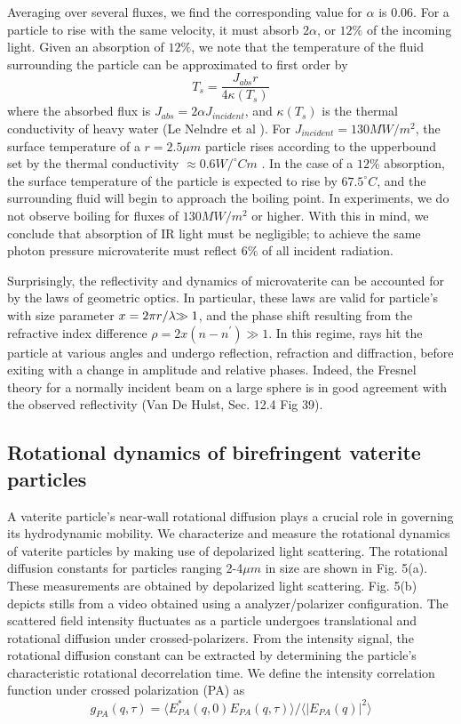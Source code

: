 {Averaging over several fluxes, we find the corresponding value for $\alpha$ is 0.06. For a particle to rise with the same velocity, it must  absorb  $2\alpha$, or $12\%$ of the incoming light.  Given an absorption of $12\%$, we note that the temperature of the fluid surrounding
the particle can be approximated to first order by 
\[
T_{s}=\frac{J_{abs}r}{4\kappa(T_{s})}
\]
 where the absorbed flux is $J_{abs}=2\alpha J_{incident}$, and $\kappa(T_{s})$
is the thermal conductivity of heavy water (Le Nelndre et al ). For
$J_{incident}=130 MW/m^{2}$, the surface temperature of a $r=2.5\mu m$
particle rises according to the upperbound set by the thermal conductivity $\approx 0.6\text{}W/^{\circ}Cm$ . In the case of a $12\%$ absorption,
the surface temperature of the particle is expected to rise by $67.5^{\circ}C$,
and the surrounding fluid will begin to approach the boiling point.
In experiments, we do not observe boiling for fluxes of $130MW/m^{2}$
or higher. With this in mind, we conclude that absorption
of IR light must be negligible; to achieve the same photon pressure
microvaterite must reflect $6\%$ of all incident radiation. 

Surprisingly, the reflectivity and dynamics of microvaterite can be accounted for by the laws of geometric optics. In particular, these laws are valid for particle's with size parameter $x=\text{2\ensuremath{\pi r/\lambda}\ensuremath{\gg1}}$, and the phase shift resulting from the refractive index difference
$\rho=2x(n-n^{\prime})\gg1$. In this regime, rays hit the particle
at various angles and undergo reflection, refraction and diffraction,
before exiting with a change in amplitude and relative phases. Indeed,
the Fresnel theory for a normally incident beam on a large sphere
is in good agreement with the observed reflectivity (Van De Hulst,
Sec. 12.4 Fig 39). 
\subsection*{Rotational dynamics of birefringent vaterite particles}

A vaterite particle's near-wall rotational diffusion plays a crucial role in governing its hydrodynamic mobility. We characterize and measure the rotational dynamics of vaterite particles by making use of depolarized light scattering. The rotational diffusion constants for particles ranging  2-4$\mu m$ in size are shown in Fig. 5(a). These measurements are obtained by depolarized light scattering. Fig. 5(b) depicts stills from a video obtained using a  analyzer/polarizer configuration. The scattered field intensity fluctuates as a particle undergoes translational and rotational diffusion under crossed-polarizers. From the intensity signal, the rotational diffusion constant can be extracted by determining the particle's characteristic rotational decorrelation time. We define the intensity correlation function under crossed polarization (PA) as
\begin{equation}
g_{PA}(q,\tau)=\langle E_{PA}^{*}(q,0)E_{PA}(q,\tau)\rangle/\langle|E_{PA}(q)|^{2}\rangle
\end{equation}

}

